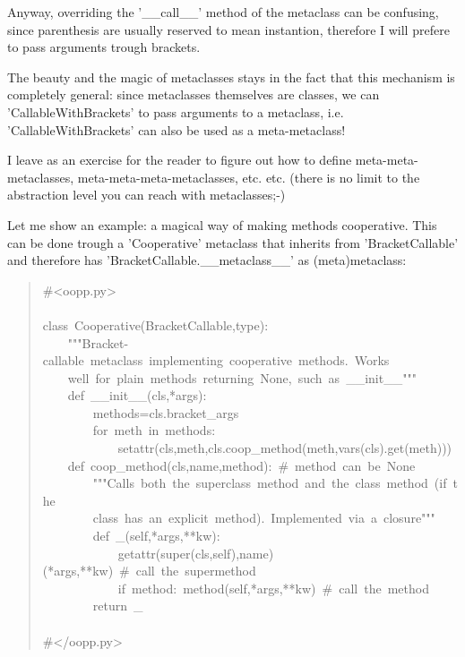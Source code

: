 \documentclass[10pt,english]{article}
\begin{document}
Anyway, overriding the '{\_}{\_}call{\_}{\_}' method of the metaclass can be 
confusing, since parenthesis are usually reserved to mean instantion,
therefore I will prefere to pass arguments trough brackets.

The beauty and the magic of metaclasses stays in the fact that this mechanism 
is completely general: since metaclasses themselves are classes, we can
'CallableWithBrackets' to pass arguments to a metaclass, i.e.
'CallableWithBrackets' can also be used as a meta-metaclass!

I leave as an exercise for the reader to figure out
how to define meta-meta-metaclasses, meta-meta-meta-metaclasses, etc.
etc. (there is no limit to the abstraction level you can reach with 
metaclasses;-)

Let me show an example: a magical way of making methods cooperative.
This can be done trough a 'Cooperative' metaclass that inherits from
'BracketCallable' and therefore has 'BracketCallable.{\_}{\_}metaclass{\_}{\_}'
as (meta)metaclass:
\begin{quote}
\begin{ttfamily}\begin{flushleft}
\mbox{{\#}<oopp.py>}\\
\mbox{}\\
\mbox{class~Cooperative(BracketCallable,type):}\\
\mbox{~~~~"""Bracket-callable~metaclass~implementing~cooperative~methods.~Works}\\
\mbox{~~~~well~for~plain~methods~returning~None,~such~as~{\_}{\_}init{\_}{\_}"""}\\
\mbox{~~~~def~{\_}{\_}init{\_}{\_}(cls,*args):}\\
\mbox{~~~~~~~~methods=cls.bracket{\_}args}\\
\mbox{~~~~~~~~for~meth~in~methods:~}\\
\mbox{~~~~~~~~~~~~setattr(cls,meth,cls.coop{\_}method(meth,vars(cls).get(meth)))}\\
\mbox{~~~~def~coop{\_}method(cls,name,method):~{\#}~method~can~be~None}\\
\mbox{~~~~~~~~"""Calls~both~the~superclass~method~and~the~class~method~(if~the~}\\
\mbox{~~~~~~~~class~has~an~explicit~method).~Implemented~via~a~closure"""}\\
\mbox{~~~~~~~~def~{\_}(self,*args,**kw):}\\
\mbox{~~~~~~~~~~~~getattr(super(cls,self),name)(*args,**kw)~{\#}~call~the~supermethod}\\
\mbox{~~~~~~~~~~~~if~method:~method(self,*args,**kw)~{\#}~call~the~method}\\
\mbox{~~~~~~~~return~{\_}}\\
\mbox{}\\
\mbox{{\#}</oopp.py>}
\end{flushleft}\end{ttfamily}
\end{quote}
\end{document}
